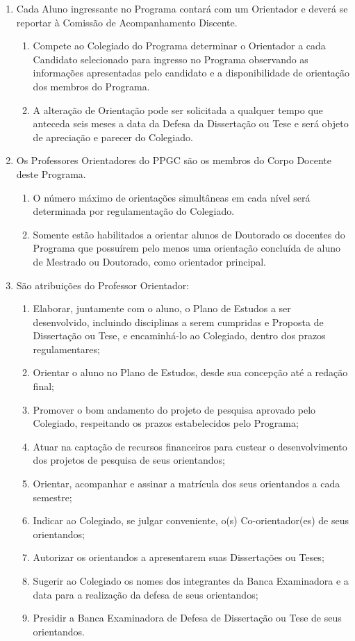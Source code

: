\documentclass{article}
\begin{document}
\begin{enumerate}
	\item Cada Aluno ingressante no Programa contará com um Orientador e deverá se reportar à Comissão de Acompanhamento Discente.
	\begin{enumerate}
		\item Compete ao Colegiado do Programa determinar o Orientador a cada Candidato selecionado para ingresso no Programa observando as informações apresentadas pelo candidato e a disponibilidade de orientação dos membros do Programa.
		\item A alteração de Orientação pode ser solicitada a qualquer tempo que anteceda seis meses a data da Defesa da Dissertação ou Tese e será objeto de apreciação e parecer do Colegiado.
	\end{enumerate}

	\item Os Professores Orientadores do PPGC são os membros do Corpo Docente deste Programa. 
	\begin{enumerate}
		\item O número máximo de orientações simultâneas em cada nível será determinada por regulamentação do Colegiado.
		\item Somente estão habilitados a orientar alunos de Doutorado os docentes do Programa que possuírem pelo menos uma orientação concluída de aluno de Mestrado ou Doutorado, como orientador principal.
	\end{enumerate}

	\item  São atribuições do Professor Orientador:
	\begin{enumerate}[label=\Roman*]
		\item Elaborar, juntamente com o aluno, o Plano de Estudos a ser desenvolvido, incluindo disciplinas a serem cumpridas e Proposta de Dissertação ou Tese, e encaminhá-lo ao Colegiado, dentro dos prazos regulamentares;
		\item	Orientar o aluno no Plano de Estudos, desde sua concepção até a redação final;
		\item	Promover o bom andamento do projeto de pesquisa aprovado pelo Colegiado, respeitando os prazos estabelecidos pelo Programa;
		\item	Atuar na captação de recursos financeiros para custear o desenvolvimento dos projetos de pesquisa de seus orientandos;
		\item	Orientar, acompanhar e assinar a matrícula dos seus orientandos a cada semestre;
		\item	Indicar ao Colegiado, se julgar conveniente, o(s) Co-orientador(es) de seus orientandos;
		\item	Autorizar os orientandos a apresentarem suas Dissertações ou Teses;
		\item	Sugerir ao Colegiado os nomes dos integrantes da Banca Examinadora e a data para a realização da defesa de seus orientandos;
		\item	Presidir a Banca Examinadora de Defesa de Dissertação ou Tese de seus orientandos.
	\end{enumerate}


\end{enumerate}
\end{document}
